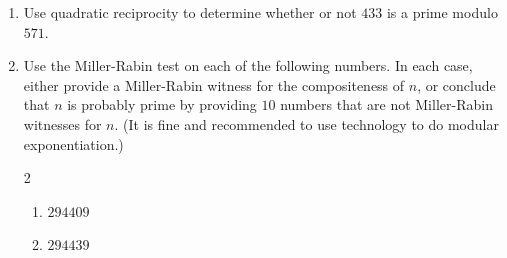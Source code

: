 \documentclass[12pt]{article}
\begin{document}
\begin{enumerate}
\item Use quadratic reciprocity to determine whether or not $433$ is a prime modulo $571$. 


\item Use the Miller-Rabin test on each of the following numbers.  In each case, either provide a Miller-Rabin witness for the compositeness of $n$, or conclude that $n$ is probably prime by providing $10$ numbers that are not Miller-Rabin witnesses for $n$.  (It is fine and recommended to use technology to do modular exponentiation.)
\begin{multicols}{2}
\begin{enumerate}
\item $294409$
\item $294439$
\end{enumerate}
\end{multicols}
\end{enumerate}
\end{document}
